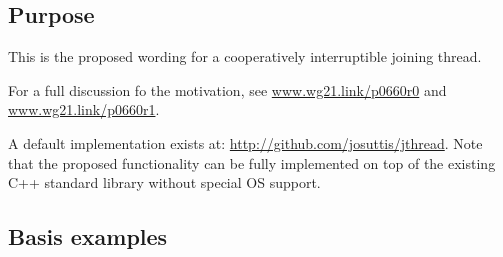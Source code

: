 \subsection*{Purpose}

This is the proposed wording for a cooperatively interruptible joining thread.

For a full discussion fo the motivation, see
\url{www.wg21.link/p0660r0} and
\url{www.wg21.link/p0660r1}.

A default implementation exists at:
\url{http://github.com/josuttis/jthread}.
Note that the proposed functionality can be fully implemented 
on top of the existing C++ standard library without special OS support.

\subsection*{Basis examples}

